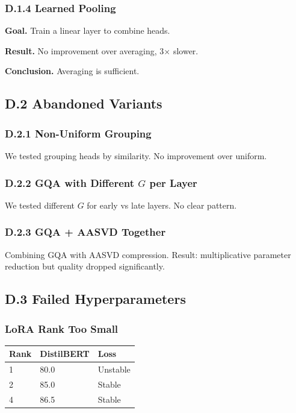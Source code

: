 \subsubsection{D.1.4 Learned Pooling}

\textbf{Goal.} Train a linear layer to combine heads.

\textbf{Result.} No improvement over averaging, 3$\times$ slower.

\textbf{Conclusion.} Averaging is sufficient.

\subsection{D.2 Abandoned Variants}

\subsubsection{D.2.1 Non-Uniform Grouping}

We tested grouping heads by similarity. No improvement over uniform.

\subsubsection{D.2.2 GQA with Different $G$ per Layer}

We tested different $G$ for early vs late layers. No clear pattern.

\subsubsection{D.2.3 GQA + AASVD Together}

Combining GQA with AASVD compression. Result: multiplicative parameter 
reduction but quality dropped significantly.

\subsection{D.3 Failed Hyperparameters}

\subsubsection{LoRA Rank Too Small}

\begin{table}[H]
\centering
\small
\begin{tabular}{lll}
\toprule
\textbf{Rank} & \textbf{DistilBERT} & \textbf{Loss} \\
\midrule
1 & 80.0 & Unstable \\
2 & 85.0 & Stable \\
4 & 86.5 & Stable \\
\bottomrule
\end{tabular}
\end{table}

